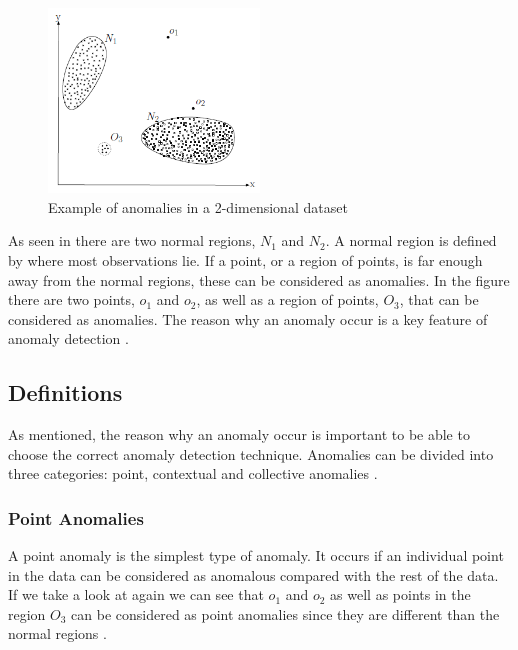 \documentclass[english, a4paper]{report}
\begin{document}
{{{            \begin{figure}[H]
                \centering
                \includegraphics[width=0.5\textwidth]{anomalies}
                \caption{Example of anomalies in a 2-dimensional dataset \cite{anomalyDetection}}
                \label{fig:anomalies}
            \end{figure} 
            
            \par
            As seen in  there are two normal regions, $N_{1}$ and $N_{2}$. A normal region is defined by where most observations lie. If a point, or a region of points, is far enough away from the normal regions, these can be considered as anomalies. In the figure there are two points, $o_{1}$ and $o_{2}$, as well as a region of points, $O_{3}$, that can be considered as anomalies. The reason why an anomaly occur is a key feature of anomaly detection \cite{anomalyDetection}. 
        }
        
        \subsection{Definitions}\label{anomDefinitions}
        {
            As mentioned, the reason why an anomaly occur is important to be able to choose the correct anomaly detection technique. Anomalies can be divided into three categories: point, contextual and collective anomalies \cite{anomalyDetection}. 
            
            \subsubsection{Point Anomalies}
            {
                A point anomaly is the simplest type of anomaly. It occurs if an individual point in the data can be considered as anomalous compared with the rest of the data. If we take a look at  again we can see that $o_{1}$ and $o_{2}$ as well as points in the region $O_{3}$ can be considered as point anomalies since they are different than the normal regions \cite{anomalyDetection}. 
            }
            
}}}
\end{document}
